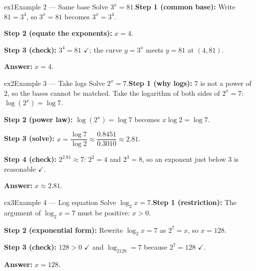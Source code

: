 \documentclass[11pt]{article}
\begin{document}
\begin{example}{ex1}{Example 2 --- Same base}
Solve $3^x=81$.\soln \textbf{Step 1 (common base):} Write $81=3^4$, so $3^x=81$ becomes $3^x=3^4$.

\textbf{Step 2 (equate the exponents):} $x=4$.

\textbf{Step 3 (check):} $3^4=81$ $\checkmark$; the curve $y=3^x$ meets $y=81$ at $(4,81)$.

\textbf{Answer:} $x=4$.

\end{example}

\begin{example}{ex2}{Example 3 --- Take logs}
Solve $2^x=7$.\soln \textbf{Step 1 (why logs):} $7$ is not a power of $2$, so the bases cannot be matched. Take the logarithm of both sides of $2^x=7$: $\log(2^x)=\log7$.

\textbf{Step 2 (power law):} $\log(2^x)=\log7$ becomes $x\log2=\log7$.

\textbf{Step 3 (solve):} $x=\dfrac{\log7}{\log2}\approx\dfrac{0.8451}{0.3010}\approx2.81$.

\textbf{Step 4 (check):} $2^{2.81}\approx7$: $2^2=4$ and $2^3=8$, so an exponent just below $3$ is reasonable $\checkmark$.

\textbf{Answer:} $x\approx2.81$.

\end{example}

\begin{example}{ex3}{Example 4 --- Log equation}
Solve $\log_2 x=7$.\soln \textbf{Step 1 (restriction):} The argument of $\log_2x=7$ must be positive: $x>0$.

\textbf{Step 2 (exponential form):} Rewrite $\log_2x=7$ as $2^7=x$, so $x=128$.

\textbf{Step 3 (check):} $128>0$ $\checkmark$ and $\log_2128=7$ because $2^7=128$ $\checkmark$.

\textbf{Answer:} $x=128$.

\end{example}
\end{document}
